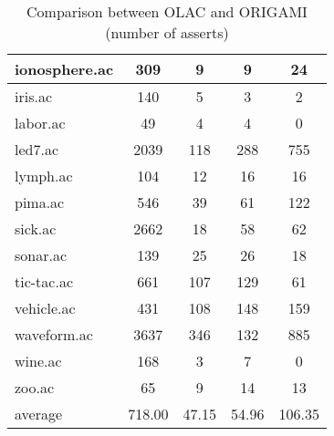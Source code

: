 \begin{table}[htbp]
\begin{tabular}{|l|c|c|c|c|}
		\hline
		ionosphere.ac   & 309           & 9                  & 9                        & 24                            \\
		\hline
		iris.ac         & 140           & 5                  & 3                        & 2                             \\
		\hline
		labor.ac        & 49            & 4                  & 4                        & 0                             \\
		\hline
		led7.ac         & 2039          & 118                & 288                      & 755                           \\
		\hline
		lymph.ac        & 104           & 12                 & 16                       & 16                            \\
		\hline
		pima.ac         & 546           & 39                 & 61                       & 122                           \\
		\hline
		sick.ac         & 2662          & 18                 & 58                       & 62                            \\
		\hline
		sonar.ac        & 139           & 25                 & 26                       & 18                            \\
		\hline
		tic-tac.ac      & 661           & 107                & 129                      & 61                            \\
		\hline
		vehicle.ac      & 431           & 108                & 148                      & 159                           \\
		\hline
		waveform.ac     & 3637          & 346                & 132                      & 885                           \\
		\hline
		wine.ac         & 168           & 3                  & 7                        & 0                             \\
		\hline
		zoo.ac          & 65            & 9                  & 14                       & 13                            \\
		\hline
		average         & 718.00        & 47.15              & 54.96                    & 106.35                        \\
		\hline
		\end{tabular}
	\caption{Comparison between OLAC and ORIGAMI (number of asserts)}
	\label{tab:comparison_olac_origami_uc}
\end{table}